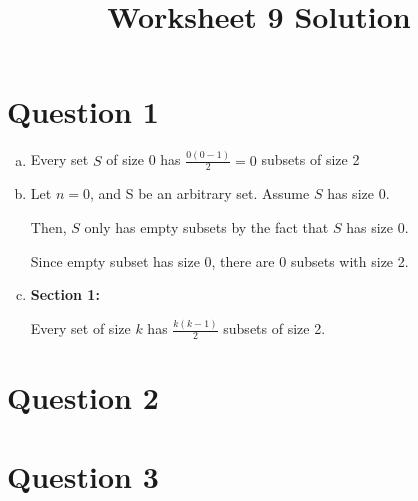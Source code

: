 \documentclass[12pt]{article}
\begin{document}
\title{Worksheet 9 Solution}
\maketitle

\section*{Question 1}
\begin{enumerate}[a.]
    \item

    Every set $S$ of size 0 has $\frac{0(0-1)}{2} = 0$ subsets of size 2

    \item

    Let $n = 0$, and S be an arbitrary set. Assume $S$ has size 0.

    \bigskip

    Then, $S$ only has empty subsets by the fact that $S$ has size 0.

    \bigskip

    Since empty subset has size 0, there are 0 subsets with size 2.

    \item

    \textbf{Section 1:}

    \bigskip

    Every set of size $k$ has $\frac{k(k-1)}{2}$ subsets of size 2.


\end{enumerate}

\section*{Question 2}

\section*{Question 3}
\end{document}
